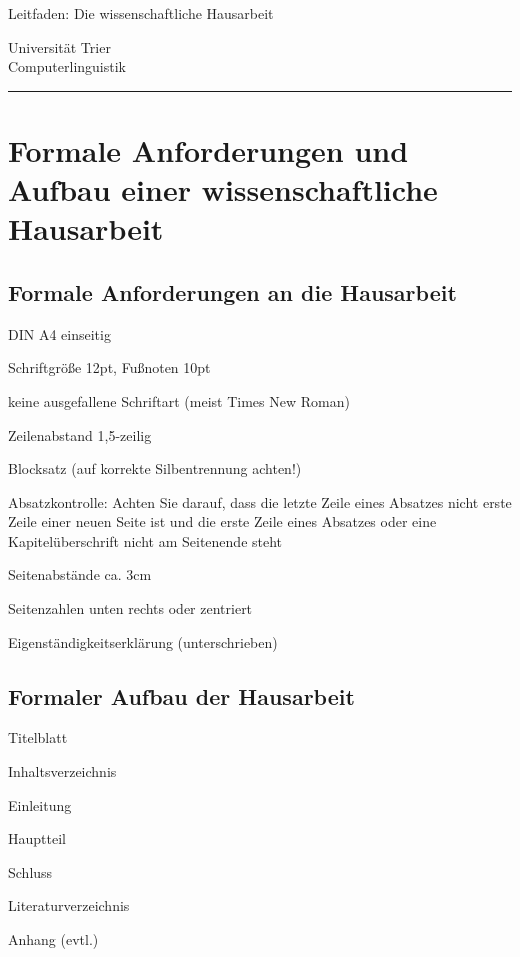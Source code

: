 \documentclass[a4paper,oneside,DIV8,10pt]{scrartcl}
\makeatletter
\newcommand{\handouttitle}[4]
   {\begin{center}
      \Large #4 \\
      \small #2
    \end{center}
    \bigskip
    \noindent
    #1 \\ #3
    \hfill
    
    \noindent
    \rule{\linewidth}{.5pt}
    
    \@afterindentfalse\@afterheading
   }
\makeatother
\begin{document}
\onehalfspacing
  \handouttitle{Universität Trier}
               {}
               {Computerlinguistik}
               {Leitfaden: Die wissenschaftliche Hausarbeit}

\section{Formale Anforderungen und Aufbau einer wissenschaftliche Hausarbeit}

    \subsection{Formale Anforderungen an die Hausarbeit}
        \begin{compactitem}
            \item DIN A4 einseitig
            \item Schriftgröße 12pt, Fußnoten 10pt
            \item keine ausgefallene Schriftart (meist Times New Roman)
            \item Zeilenabstand 1,5-zeilig 
            \item Blocksatz (auf korrekte Silbentrennung achten!)
            \item Absatzkontrolle: Achten Sie darauf, dass die letzte Zeile 
            eines Absatzes nicht erste Zeile einer neuen Seite ist und die 
            erste Zeile eines Absatzes oder eine Kapitelüberschrift nicht 
            am Seitenende steht 
            \item Seitenabstände ca. 3cm
            \item Seitenzahlen unten rechts oder zentriert
            \item Eigenständigkeitserklärung (unterschrieben)
        \end{compactitem}

    \subsection{Formaler Aufbau der Hausarbeit}
        \begin{compactitem}
            \item Titelblatt
            \item Inhaltsverzeichnis
            \item Einleitung
            \item Hauptteil
            \item Schluss
            \item Literaturverzeichnis
            \item Anhang (evtl.)
        \end{compactitem}
\end{document}
